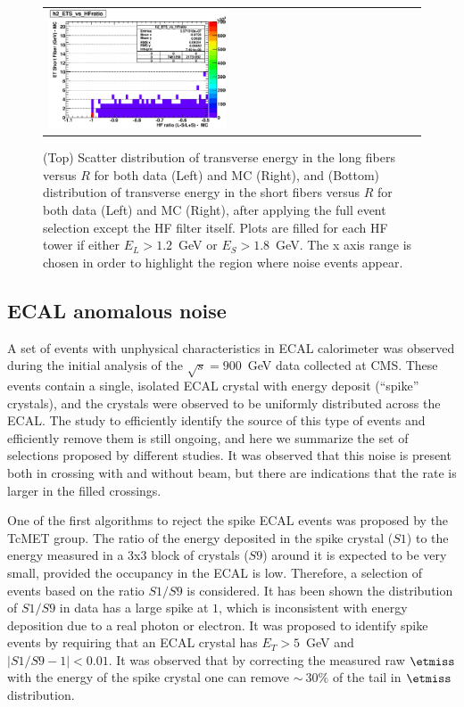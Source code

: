 \begin{itemize}
\begin{figure}[h!]
\begin{tabular}{ll}
  \includegraphics[width=0.5\textwidth]{plots_hcalnoise/hf_shortfiberET_vs_ratio_MC.eps} \\
 \end{tabular}
\caption{\small (Top) Scatter distribution of transverse energy in the long fibers versus $R$ for both data (Left) and MC (Right), 
and (Bottom) distribution of transverse energy in the short fibers versus $R$ for both data (Left) and MC (Right), 
after applying the full event selection except the HF filter itself. 
Plots are filled for each HF tower if either $E_L>1.2$~GeV or $E_S>1.8$~GeV. 
The x axis range is chosen in order to highlight the region where noise events appear. \label{fig:hf_noise_longshortFiber}}
\end{figure}
%
%
\end{itemize}

\subsection{ECAL anomalous noise}

A set of events with unphysical characteristics in ECAL calorimeter was
observed during the initial analysis of the $\sqrt{s}=900$~GeV data
collected at CMS. These events contain a single, isolated ECAL crystal
with energy deposit (``spike'' crystals), and the crystals were observed
to be uniformly distributed across the ECAL. The
study to efficiently identify the source of this type of events and
efficiently remove them is still ongoing, and here we summarize the set
of selections proposed by different studies. It was observed that this
noise is present both in crossing with and without beam, but there are
indications that the rate is larger in the filled crossings.

One of the first algorithms to reject the spike ECAL events was proposed
by the TcMET group. The ratio of the energy deposited in the spike
crystal ($S1$) to the energy measured in a 3x3 block of crystals ($S9$)
around it is expected to be very small, provided the occupancy in the
ECAL is low. Therefore, a selection of events based on the ratio $S1/S9$
is considered. It has been shown the distribution of $S1/S9$ in data has
a large spike at $1$, which is inconsistent with energy deposition due
to a real photon or electron. It was proposed to identify spike events
by requiring that an ECAL crystal has $E_T>5$~GeV and
$|S1/S9-1|<0.01$. It was observed that by correcting the measured raw
$\etmiss$ with the energy of the spike crystal one can remove
$\sim~30\%$ of the tail in $\etmiss$ distribution.

